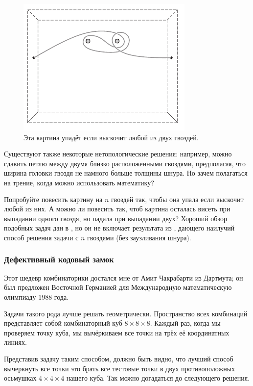\begin{figure}[h!]
\centering
\includegraphics[scale=1]{pics/kartina2}
\caption{Эта картина упадёт если выскочит любой из двух гвоздей.}
\label{pic:kartina2}
\end{figure}

Существуют также некоторые нетопологические решения: например, можно сдавить петлю между двумя близко расположенными гвоздями, предполагая, что ширина головки гвоздя не намного больше толщины шнура.
Но зачем полагаться на трение, когда можно использовать математику?

\begin{addedbytheeditors}
Попробуйте повесить картину на $n$ гвоздей так, чтобы она упала если выскочит любой из них.
А можно ли повесить так, чтоб картина осталась висеть при выпадании одного гвоздя, но падала при выпадании двух?
Хороший обзор подобных задач дан в \cite{demaine2014}, но он не включает результата из \cite{gartside-greenwood}, дающего наилучий способ решения задачи с $n$ гвоздями (без заузливания шнура).
\end{addedbytheeditors}

\subsubsection*{Дефективный кодовый замок}

Этот шедевр комбинаторики достался мне от Амит Чакрабарти из Дартмута;
он был предложен Восточной Германией для Международную математическую олимпиаду 1988 года.

Задачи такого рода лучше решать геометрически.
Пространство всех комбинаций представляет собой комбинаторный куб $8 \times 8 \times 8$.
Каждый раз, когда мы проверяем точку куба, мы вычёркиваем все точки на трёх её координатных линиях.

Представив задачу таким способом, должно быть видно, что лучший способ вычеркнуть все точки это брать все тестовые точки в двух противоположных осьмушках $4 \times 4 \times 4$ нашего куба.
Так можно догадаться до следующего решения.


